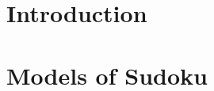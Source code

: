 \documentclass[12pt,letterpaper]{article}
\title{\articletitle}
\author{\Us}
\begin{document}
\maketitle

\begin{abstract}
    
\end{abstract}

\section{Introduction}
\label{sec:intro}


\section{Models of Sudoku}
\label{sec:models}




\end{document}
